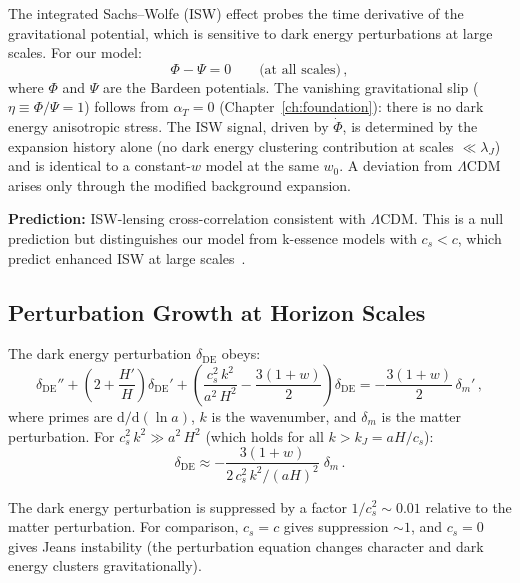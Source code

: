 The integrated Sachs--Wolfe (ISW) effect probes the time derivative of the gravitational potential, which is sensitive to dark energy perturbations at large scales. For our model:
\begin{equation}
  \Phi - \Psi = 0 \qquad\text{(at all scales)}\,,
  \label{eq:5-20}
\end{equation}
where $\Phi$ and $\Psi$ are the Bardeen potentials. The vanishing gravitational slip ($\eta \equiv \Phi/\Psi = 1$) follows from $\alpha_T = 0$ (Chapter~\ref{ch:foundation}): there is no dark energy anisotropic stress. The ISW signal, driven by $\dot{\Phi}$, is determined by the expansion history alone (no dark energy clustering contribution at scales $\ll \lambda_J$) and is identical to a constant-$w$ model at the same $w_0$. A deviation from $\Lambda$CDM arises only through the modified background expansion.

\textbf{Prediction:} ISW-lensing cross-correlation consistent with $\Lambda$CDM. This is a null prediction but distinguishes our model from k-essence models with $c_s < c$, which predict enhanced ISW at large scales~\cite{ch5:DeDeo2003}.

\subsection{Perturbation Growth at Horizon Scales}
\label{sec:5-perturbation-growth}

The dark energy perturbation $\delta_\mathrm{DE}$ obeys:
\begin{equation}
  \delta_\mathrm{DE}''
  + \left(2 + \frac{H'}{H}\right)\delta_\mathrm{DE}'
  + \left(\frac{c_s^2\,k^2}{a^2\,H^2} - \frac{3(1+w)}{2}\right)\delta_\mathrm{DE}
  = -\frac{3(1+w)}{2}\,\delta_m'\,,
  \label{eq:5-21}
\end{equation}
where primes are $\mathrm{d}/\mathrm{d}(\ln a)$, $k$ is the wavenumber, and $\delta_m$ is the matter perturbation. For $c_s^2\,k^2 \gg a^2\,H^2$ (which holds for all $k > k_J = aH/c_s$):
\begin{equation}
  \delta_\mathrm{DE}
    \approx -\frac{3(1+w)}{2\,c_s^2\,k^2/(aH)^2}\;\delta_m\,.
  \label{eq:5-22}
\end{equation}

The dark energy perturbation is suppressed by a factor $1/c_s^2 \sim 0.01$ relative to the matter perturbation. For comparison, $c_s = c$ gives suppression ${\sim}1$, and $c_s = 0$ gives Jeans instability (the perturbation equation changes character and dark energy clusters gravitationally).

